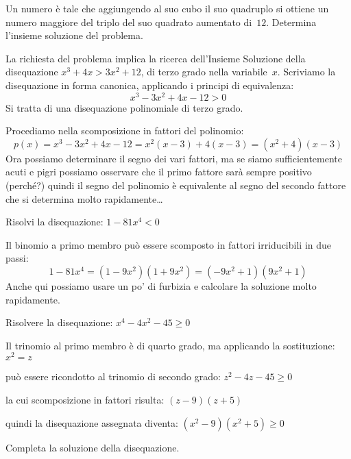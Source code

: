 \begin{esempio}
Un numero è tale che aggiungendo al suo cubo il suo quadruplo si ottiene 
un numero maggiore del triplo del suo quadrato aumentato di~\(12\). Determina 
l'insieme soluzione del problema.

La richiesta del problema implica la ricerca dell'Insieme Soluzione della 
disequazione \(x^3+4x>3x^2+12\), di terzo grado nella variabile~\(x\). 
Scriviamo la disequazione in forma canonica, applicando i principi di 
equivalenza: 
\[x^3-3x^2+4x-12>0\] 
Si tratta di una disequazione polinomiale di terzo grado.

Procediamo nella scomposizione in fattori del polinomio:
\[p(x)=x^3-3x^2+4x-12 = x^2 \left(x-3\right)+4 \left(x-3\right) =
      \left(x^2+4\right) \left(x-3\right)\]
Ora possiamo determinare il segno dei vari fattori, ma se siamo 
sufficientemente acuti e pigri possiamo osservare che il primo fattore sarà 
sempre positivo (perché?) quindi il segno del polinomio è equivalente al 
segno del secondo fattore che si determina molto rapidamente\dots
\end{esempio}

\begin{esempio}
Risolvi la disequazione: \(1-81x^4<0\)

Il binomio a primo membro può essere scomposto in fattori irriducibili in due 
passi:
\[1-81x^4 = \left(1-9x^2\right)\left(1+9x^2\right)=
  \left(-9x^2+1\right)\left(9x^2+1\right)\]
Anche qui possiamo usare un po' di furbizia e calcolare la soluzione molto 
rapidamente.
\end{esempio}

\begin{esempio}
Risolvere la disequazione: \(x^4-4x^2-45 \geqslant 0\)

Il trinomio al primo membro è di quarto grado, ma applicando la 
sostituzione: 
\(x^2=z\)

può essere ricondotto al trinomio di secondo grado:
\(z^2-4z-45 \geqslant 0\)

la cui scomposizione in fattori risulta:
\(\left(z-9\right)\left(z+5\right)\)

quindi la disequazione assegnata diventa: 
\((x^2-9)(x^2+5) \geqslant 0\)

Completa la soluzione della disequazione.
\end{esempio}

% 


